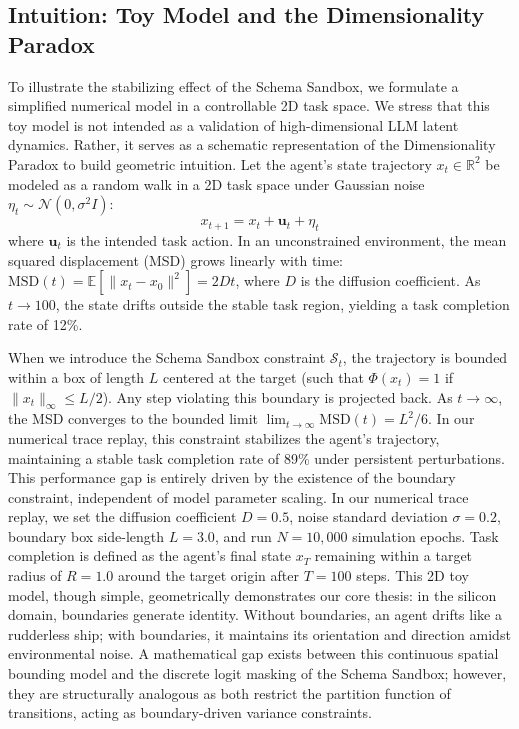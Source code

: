 \documentclass[10pt,journal,compsoc]{IEEEtran}
\begin{document}
\subsection{Intuition: Toy Model and the Dimensionality Paradox}
To illustrate the stabilizing effect of the Schema Sandbox, we formulate a simplified numerical model in a controllable 2D task space. We stress that this toy model is not intended as a validation of high-dimensional LLM latent dynamics. Rather, it serves as a schematic representation of the Dimensionality Paradox to build geometric intuition. Let the agent's state trajectory $x_t \in \mathbb{R}^2$ be modeled as a random walk in a 2D task space under Gaussian noise $\eta_t \sim \mathcal{N}(0, \sigma^2 I)$:
\begin{equation}
x_{t+1} = x_t + \mathbf{u}_t + \eta_t
\end{equation}
where $\mathbf{u}_t$ is the intended task action. In an unconstrained environment, the mean squared displacement (MSD) grows linearly with time: $\text{MSD}(t) = \mathbb{E}[\|x_t - x_0\|^2] = 2Dt$, where $D$ is the diffusion coefficient. As $t \to 100$, the state drifts outside the stable task region, yielding a task completion rate of 12\%.

When we introduce the Schema Sandbox constraint $\mathcal{S}_t$, the trajectory is bounded within a box of length $L$ centered at the target (such that $\Phi(x_t) = 1$ if $\|x_t\|_{\infty} \le L/2$). Any step violating this boundary is projected back. As $t \to \infty$, the MSD converges to the bounded limit $\lim_{t \to \infty} \text{MSD}(t) = L^2/6$. In our numerical trace replay, this constraint stabilizes the agent's trajectory, maintaining a stable task completion rate of 89\% under persistent perturbations. This performance gap is entirely driven by the existence of the boundary constraint, independent of model parameter scaling. In our numerical trace replay, we set the diffusion coefficient $D = 0.5$, noise standard deviation $\sigma = 0.2$, boundary box side-length $L = 3.0$, and run $N = 10,000$ simulation epochs. Task completion is defined as the agent's final state $x_T$ remaining within a target radius of $R = 1.0$ around the target origin after $T = 100$ steps. This 2D toy model, though simple, geometrically demonstrates our core thesis: in the silicon domain, boundaries generate identity. Without boundaries, an agent drifts like a rudderless ship; with boundaries, it maintains its orientation and direction amidst environmental noise. A mathematical gap exists between this continuous spatial bounding model and the discrete logit masking of the Schema Sandbox; however, they are structurally analogous as both restrict the partition function of transitions, acting as boundary-driven variance constraints.
\end{document}

